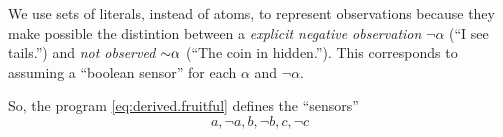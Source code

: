 \documentclass[x11names]{article}
\begin{document}
We use sets of literals, instead of atoms, to represent observations because they make possible the distintion between a \emph{explicit negative observation} \(\neg\alpha\) (\eg ``I see tails.'') and \emph{not observed} \(\operatorname{\sim\!} \alpha\) (\eg ``The coin in hidden.''). This corresponds to assuming a ``boolean sensor'' for each $\alpha$ and $\neg \alpha$.

So, the program \ref{eq:derived.fruitful} defines the ``sensors''
\begin{equation*}
    a, \neg a, b, \neg b, c, \neg c
\end{equation*}

\nocite{*}

\printbibliography
\end{document}
